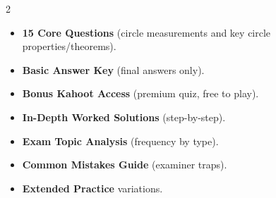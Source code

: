 \documentclass[11pt,a4paper]{article}
\newcommand{\FullReleaseDate}{April 30, 2026}
\begin{document}
\vspace{8pt}

\begin{multicols}{2}
  \begin{tcolorbox}[card, title=\sffamily\bfseries\textcolor{white}{\faHandPointDown\ TODAY (Simplified Version)}, colbacktitle=mainblue, boxed title style={sharp corners, boxrule=0pt}]
    \begin{itemize}[leftmargin=1.2em, itemsep=2pt]
      \item \small \textbf{15 Core Questions} (circle measurements and key circle properties/theorems).
      \item \small \textbf{Basic Answer Key} (final answers only).
      \item \small \textbf{Bonus Kahoot Access} (premium quiz, free to play).
    \end{itemize}
  \end{tcolorbox}

  \columnbreak

  \begin{tcolorbox}[card, title=\sffamily\bfseries\textcolor{white}{\faRocket\ ON \FullReleaseDate\ (Full Upgrade)}, colbacktitle=mainblue, boxed title style={sharp corners, boxrule=0pt}]
    \begin{itemize}[leftmargin=1.2em, itemsep=2pt]
      \item \small \textbf{In-Depth Worked Solutions} (step-by-step).
      \item \small \textbf{Exam Topic Analysis} (frequency by type).
      \item \small \textbf{Common Mistakes Guide} (examiner traps).
      \item \small \textbf{Extended Practice} variations.
    \end{itemize}
  \end{tcolorbox}
\end{multicols}
\end{document}
